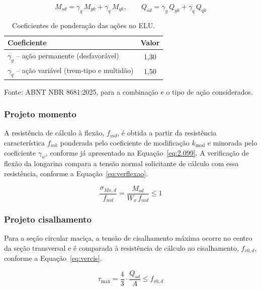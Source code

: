 \begin{equation}
M_{sd} = \gamma_g\,M_{gk} + \gamma_q\,M_{qk}, \qquad Q_{sd} = \gamma_g\,Q_{gk} + \gamma_q\,Q_{qk}
\label{eq:comb}
\end{equation}

\begin{table}[htpb!]
\centering
\caption{Coeficientes de ponderação das ações no ELU.}
\label{tab:ponderadores_acoes}
\footnotesize
\begin{tabular}{lc}
\hline
\textbf{Coeficiente} & \textbf{Valor} \\
\hline
$\gamma_g$ -- ação permanente (desfavorável) & 1,30 \\
$\gamma_q$ -- ação variável (trem-tipo e multidão) & 1,50 \\
\hline
\end{tabular}

\vspace{0.2cm}
\small Fonte: ABNT NBR 8681:2025, para a combinação e o tipo de ação considerados.
\end{table}

\subsubsection{Projeto momento}

A resistência de cálculo à flexão, $f_{md}$, é obtida a partir da resistência característica $f_{mk}$ ponderada pelo coeficiente de modificação $k_{\mathrm{mod}}$ e minorada pelo coeficiente $\gamma_w$, conforme já apresentado na Equação~\eqref{eq:2.099}.
A verificação de flexão da longarina compara a tensão normal solicitante de cálculo com essa resistência, conforme a Equação~\eqref{eq:verflexao}.

\begin{equation}
\frac{\sigma_{Mx,d}}{f_{md}} = \frac{M_{sd}}{W_x\,f_{md}} \leq 1
\label{eq:verflexao}
\end{equation}

\subsubsection{Projeto cisalhamento}

Para a seção circular maciça, a tensão de cisalhamento máxima ocorre no centro da seção transversal e é comparada à resistência de cálculo ao cisalhamento, $f_{v0,d}$, conforme a Equação~\eqref{eq:vercis}.

\begin{equation}
\tau_{\max} = \frac{4}{3}\cdot\frac{Q_{sd}}{A} \leq f_{v0,d}
\label{eq:vercis}
\end{equation}


